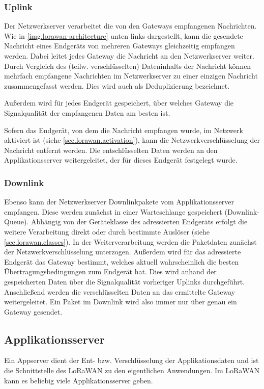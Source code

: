 \subsubsection{Uplink}
Der Netzwerkserver verarbeitet die von den Gateways empfangenen Nachrichten.
Wie in \autoref{img.lorawan-architecture} unten links dargestellt, kann die gesendete Nachricht eines Endgeräts von mehreren Gateways gleichzeitig empfangen werden.
Dabei leitet jedes Gateway die Nachricht an den Netzwerkserver weiter.
Durch Vergleich des (teilw. verschlüsselten) Dateninhalts der  Nachricht können mehrfach empfangene Nachrichten im Netzwerkserver zu einer einzigen Nachricht zusammengefasst werden.
Dies wird auch als Deduplizierung bezeichnet.

Außerdem wird für jedes Endgerät gespeichert, über welches Gateway die Signalqualität der empfangenen Daten am besten ist.

Sofern das Endgerät, von dem die Nachricht empfangen wurde, im Netzwerk aktiviert ist (siehe \autoref{sec.lorawan.activation}), kann die Netzwerkverschlüsselung der Nachricht entfernt werden.
Die entschlüsselten Daten werden an den Applikationsserver weitergeleitet, der für dieses Endgerät festgelegt wurde.

\subsubsection{Downlink}
Ebenso kann der Netzwerkserver Downlinkpakete vom Applikationsserver empfangen.
Diese werden zunächst in einer Warteschlange gespeichert (Downlink-Queue).
Abhängig von der Geräteklasse des adressierten Endgeräts erfolgt die weitere Verarbeitung direkt oder durch bestimmte Auslöser (siehe \autoref{sec.lorawan.classes}).
In der Weiterverarbeitung werden die Paketdaten zunächst der Netzwerkverschlüsselung unterzogen.
Außerdem wird für das adressierte Endgerät das Gateway bestimmt, welches aktuell wahrscheinlich die besten Übertragungsbedingungen zum Endgerät hat.
Dies wird anhand der gespeicherten Daten über die Signalqualität vorheriger Uplinks durchgeführt.
Anschließend werden die verschlüsselten Daten an das ermittelte Gateway weitergeleitet.
Ein Paket im Downlink wird also immer nur über genau ein Gateway gesendet.


\subsection{Applikationsserver}
Ein \gls{Appserver} dient der Ent- bzw. Verschlüsselung der Applikationsdaten und ist die Schnittstelle des LoRaWAN zu den eigentlichen Anwendungen.
Im LoRaWAN kann es beliebig viele Applikationsserver geben.

